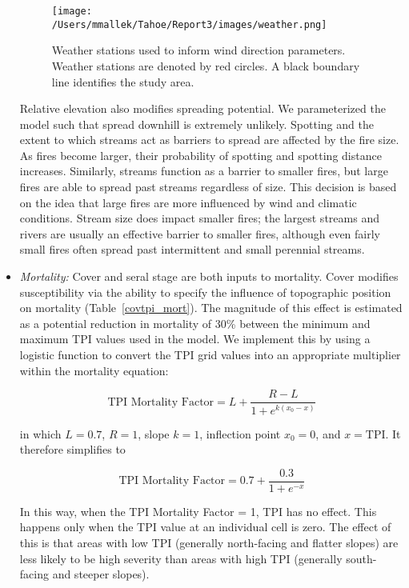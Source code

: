 \begin{itemize}
\begin{figure}[htbp]
\centering
\texttt{[image: /Users/mmallek/Tahoe/Report3/images/weather.png]}
\caption{Weather stations used to inform wind direction parameters. Weather stations are denoted by red circles. A black boundary line identifies the study area.}
\label{weather}
\end{figure}

Relative elevation also modifies spreading potential. We parameterized the model such that spread downhill is extremely unlikely. Spotting and the extent to which streams act as barriers to spread are affected by the fire size. As fires become larger, their probability of spotting and spotting distance increases. Similarly, streams function as a barrier to smaller fires, but large fires are able to spread past streams regardless of size. This decision is based on the idea that large fires are more influenced by wind and climatic conditions. Stream size does impact smaller fires; the largest streams and rivers are usually an effective barrier to smaller fires, although even fairly small fires often spread past intermittent and small perennial streams. 


\item \emph{Mortality:} Cover and seral stage are both inputs to mortality. Cover modifies susceptibility via the ability to specify the influence of topographic position on mortality (Table~\ref{covtpi_mort}). The magnitude of this effect is estimated as a potential reduction in mortality of 30\% between the minimum and maximum TPI values used in the model. We implement this by using a logistic function to convert the TPI grid values into an appropriate multiplier within the mortality equation:


$$\text{TPI Mortality Factor} = L + \frac{R-L}{1+e^{k(x_0-x)}}$$

in which $L= 0.7$, $R=1$, slope $k=1$, inflection point $x_0=0$, and $x=\text{TPI}$.%
It therefore simplifies to 

$$\text{TPI Mortality Factor} = 0.7 + \frac{0.3}{1+e^{-x}}$$

In this way, when the TPI Mortality Factor = 1, TPI has no effect. This happens only when the TPI value at an individual cell is zero. The effect of this is that areas with low TPI (generally north-facing and flatter slopes) are less likely to be high severity than areas with high TPI (generally south-facing and steeper slopes).


\end{itemize}
